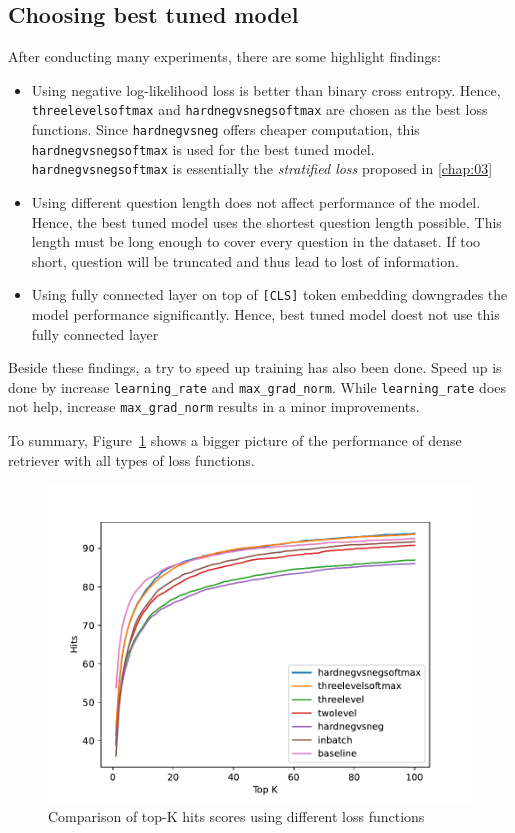 \documentclass[12pt, sort&compress]{report}
\begin{document}
\subsection{Choosing best tuned model}
After conducting many experiments, there are some highlight findings:
\begin{itemize}
	\item Using negative log-likelihood loss is better than binary cross entropy. Hence, {\tt threelevelsoftmax} and {\tt hardnegvsnegsoftmax} are chosen as the best loss functions. Since {\tt hardnegvsneg} offers cheaper computation, this {\tt hardnegvsnegsoftmax} is used for the best tuned model. {\tt hardnegvsnegsoftmax} is essentially the \textit{stratified loss} proposed in \ref{chap:03}
	\item Using different question length does not affect performance of the model. Hence, the best tuned model uses the shortest question length possible. This length must be long enough to cover every question in the dataset. If too short, question will be truncated and thus lead to lost of information.
	\item Using fully connected layer on top of {\tt [CLS]} token embedding downgrades the model performance significantly. Hence, best tuned model doest not use this fully connected layer 
\end{itemize}
\par Beside these findings, a try to speed up training has also been done. Speed up is done by increase {\tt learning\_rate} and {\tt max\_grad\_norm}. While {\tt learning\_rate} does not help, increase {\tt max\_grad\_norm} results in a minor improvements.
\par To summary, Figure~\ref{fig:21} shows a bigger picture of the performance of dense retriever with all types of loss functions.
\begin{figure}
	\centering
	\includegraphics[scale=.7]{images/PDF/experiments/K_hits.pdf}
	\caption{Comparison of top-K hits scores using different loss functions}
	\label{fig:21}
\end{figure}
\end{document}
